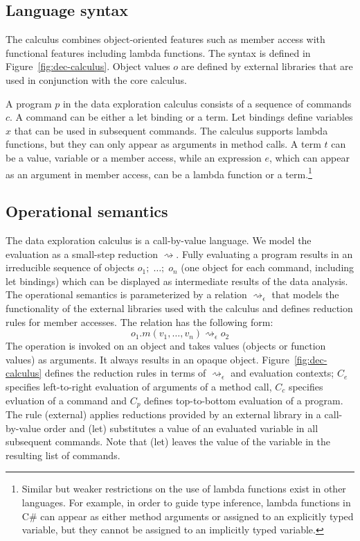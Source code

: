 \documentclass[acmsmall,anonymous,fleqn]{acmart}\settopmatter{printfolios=false,printccs=false,printacmref=false}
\theoremstyle{plain}
\theoremstyle{definition}
\newcommand{\rname}[1]{{\sffamily\small(#1)}}
\begin{document}

\subsection{Language syntax}
The calculus combines object-oriented features such as member access with functional features
including lambda functions. The syntax is defined in Figure~\ref{fig:dec-calculus}. Object values
$o$ are defined by external libraries that are used in conjunction with the core calculus.

A program $p$ in the data exploration calculus consists of a sequence of commands $c$. A command
can be either a let binding or a term. Let bindings define variables $x$ that can be used in
subsequent commands. The calculus supports lambda functions, but they
can only appear as arguments in method calls. A term $t$ can be a value, variable or a
member access, while an expression $e$, which can appear as an argument in member access,
can be a lambda function or a term.\footnote{Similar but weaker restrictions on the use of lambda
functions exist in other languages. For example, in order to guide type inference, lambda functions
in C\# can appear as either method arguments or assigned to an explicitly typed variable, but they
cannot be assigned to an implicitly typed variable.}

\subsection{Operational semantics}
\label{sec:calculus-semantics}

The data exploration calculus is a call-by-value language. We model the evaluation as a small-step
reduction $\rightsquigarrow$. Fully evaluating a program results in an irreducible sequence of
objects $o_1;\; \ldots;\; o_n$ (one object for each command, including let bindings) which can be
displayed as intermediate results of the data analysis. The operational semantics is parameterized
by a relation $\rightsquigarrow_\epsilon$ that models the functionality of the external libraries
used with the calculus and defines reduction rules for member accesses. The relation has the
following form:
%
\begin{equation*}
o_1.m(v_1, \ldots, v_n) \rightsquigarrow_\epsilon o_2
\end{equation*}
%
The operation is invoked on an object and takes values (objects or function values) as arguments.
It always results in an opaque object.
Figure~\ref{fig:dec-calculus} defines the reduction rules in terms of $\rightsquigarrow_\epsilon$
and evaluation contexts; $C_e$ specifies left-to-right evaluation of arguments of a method call,
$C_c$ specifies evluation of a command and $C_p$ defines top-to-bottom evaluation of a program.
The rule \rname{external} applies reductions provided by an external library in a
call-by-value order and \rname{let} substitutes a value of an evaluated variable in
all subsequent commands. Note that \rname{let} leaves the value of the variable
in the resulting list of commands.
\end{document}
